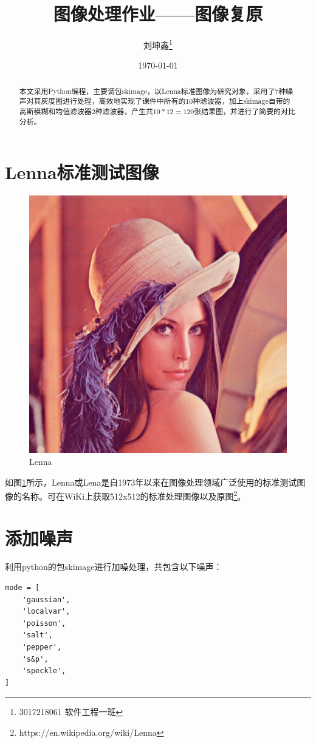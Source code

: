 \documentclass{article}
\begin{document}
\title{图像处理作业——图像复原}
\author{刘坤鑫\thanks{3017218061 软件工程一班}}
\date{\today}
\maketitle
\begin{abstract}
	本文采用Python编程，主要调包skimage，以Lenna标准图像为研究对象，采用了7种噪声对其灰度图进行处理，高效地实现了课件中所有的10种滤波器，加上skimage自带的高斯模糊和均值滤波器2种滤波器，产生共$10*12=120$张结果图，并进行了简要的对比分析。
\end{abstract}

\section{Lenna标准测试图像}

\begin{figure}[ht]
	\centering
	\includegraphics[width=0.6\linewidth]{fig/Lena.png}
	\caption{Lenna}
	\label{fig:Lenna}
\end{figure}

如图\ref{fig:Lenna}所示，Lenna或Lena是自1973年以来在图像处理领域广泛使用的标准测试图像的名称。可在WiKi上获取512x512的标准处理图像以及原图\footnote{https://en.wikipedia.org/wiki/Lenna}。

\section{添加噪声}

利用python的包skimage进行加噪处理，共包含以下噪声：

\begin{lstlisting}[title={skimage.util.random\_noise中mode参数设置}]
mode = [
	'gaussian',
	'localvar',
	'poisson',
	'salt',
	'pepper',
	's&p',
	'speckle',
]
\end{lstlisting}
\end{document}
